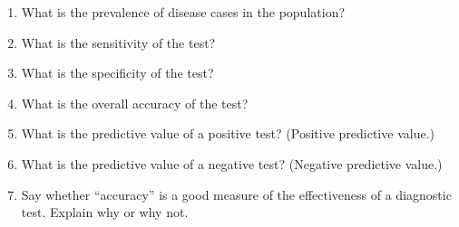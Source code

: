 \begin{enumerate}
\item What is the prevalence of disease cases in the population?
\begin{MultipleChoice}[itemname=III-45]
\end{MultipleChoice}
\item What is the sensitivity of the test?
\begin{MultipleChoice}[itemname=III-46]
\end{MultipleChoice}
\item What is the specificity of the test?
\begin{MultipleChoice}[itemname=III-47]
\end{MultipleChoice}
\item What is the overall accuracy of the test?
\begin{MultipleChoice}[itemname=III-48]
\end{MultipleChoice}
\item What is the predictive value of a positive test? (Positive predictive value.)
\begin{MultipleChoice}[itemname=III-49]
\end{MultipleChoice}
\item What is the predictive value of a negative test? (Negative predictive value.)
\begin{MultipleChoice}[itemname=III-50]
\end{MultipleChoice}
\item Say whether ``accuracy'' is a good measure of the effectiveness of a diagnostic test.  Explain why or why not.
\end{enumerate}

